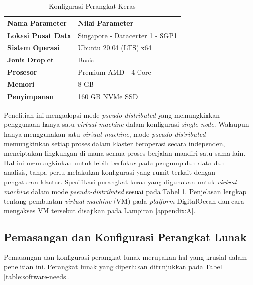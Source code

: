 \begin{table}[h!]
	\centering
	\caption{Konfigurasi Perangkat Keras}
	\begin{tabular}{l p{9cm}} 
		\toprule
		\textbf{Nama Parameter}    & \textbf{Nilai Parameter} \\ 
        \midrule
		\textbf{Lokasi Pusat Data} & Singapore - Datacenter 1 - SGP1               \\ 
		\textbf{Sistem Operasi}    & Ubuntu 20.04 (LTS) x64                        \\
		\textbf{Jenis Droplet}     & Basic                                         \\ 
		\textbf{Prosesor}          & Premium AMD - 4 Core                          \\ 
		\textbf{Memori}            & 8 GB                                          \\ 
		\textbf{Penyimpanan}       & 160 GB NVMe SSD                               \\ 
        \bottomrule
	\end{tabular}
	\label{table:conf-hardware}
\end{table}
Penelitian ini mengadopsi mode \textit{pseudo-distributed} yang memungkinkan penggunaan hanya satu \textit{virtual machine} dalam konfigurasi \textit{single node}. Walaupun hanya menggunakan satu \textit{virtual machine}, mode \textit{pseudo-distributed} memungkinkan setiap proses dalam klaster beroperasi secara independen, menciptakan lingkungan di mana semua proses berjalan mandiri satu sama lain. Hal ini memungkinkan untuk lebih berfokus pada pengumpulan data dan analisis, tanpa perlu melakukan konfigurasi yang rumit terkait dengan pengaturan klaster. Spesifikasi perangkat keras yang digunakan untuk \textit{virtual machine} dalam mode \textit{pseudo-distributed} sesuai pada Tabel \ref{table:conf-hardware}. Penjelasan lengkap tentang pembuatan \textit{virtual machine} (VM) pada \textit{platform} DigitalOcean dan cara mengakses VM tersebut disajikan pada Lampiran \ref{appendix:A}.

\subsection{Pemasangan dan Konfigurasi Perangkat Lunak}
Pemasangan dan konfigurasi perangkat lunak merupakan hal yang krusial dalam penelitian ini. Perangkat lunak yang diperlukan ditunjukkan pada Tabel \ref{table:software-needs}.

